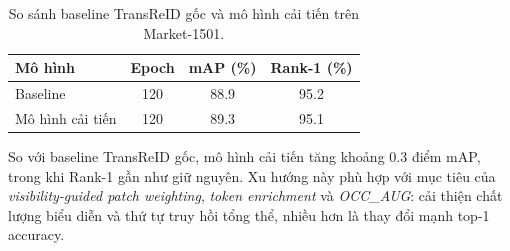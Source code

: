 \begin{table}[t]
\centering
\begin{tabular}{l|c|c|c}
\hline
Mô hình & Epoch & mAP (\%) & Rank-1 (\%) \\
\hline
Baseline & 120 & 88.9 & 95.2 \\
Mô hình cải tiến & 120 & 89.3 & 95.1 \\
\hline
\end{tabular}
\caption{So sánh baseline TransReID gốc và mô hình cải tiến trên Market-1501.}
\label{tab:baseline-vs-improved-epoch120}
\end{table}

So với baseline TransReID gốc, mô hình cải tiến tăng khoảng $0.3$ điểm mAP,
trong khi Rank-1 gần như giữ nguyên. Xu hướng này phù hợp với mục tiêu của
\textit{visibility-guided patch weighting}, \textit{token enrichment} và
\textit{OCC\_AUG}: cải thiện chất lượng biểu diễn và thứ tự truy hồi tổng thể,
nhiều hơn là thay đổi mạnh top-1 accuracy.
